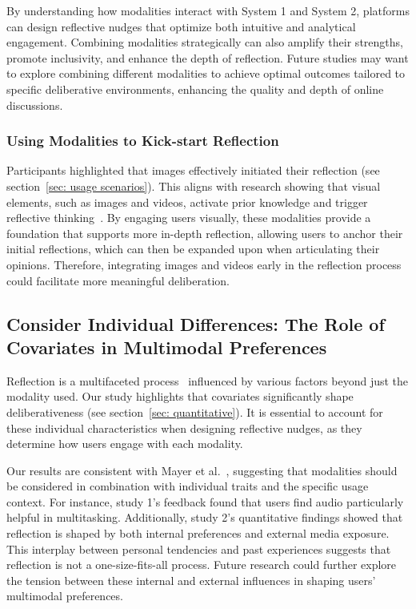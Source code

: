 By understanding how modalities interact with System 1 and System 2, platforms can design reflective nudges that optimize both intuitive and analytical engagement. Combining modalities strategically can also amplify their strengths, promote inclusivity, and enhance the depth of reflection. Future studies may want to explore combining different modalities to achieve optimal outcomes tailored to specific deliberative environments, enhancing the quality and depth of online discussions.

\subsubsection{Using Modalities to Kick-start Reflection}
Participants highlighted that images effectively initiated their reflection (see section~\ref{sec: usage scenarios}). This aligns with research showing that visual elements, such as images and videos, activate prior knowledge and trigger reflective thinking~\cite{mayer2005cambridge}. By engaging users visually, these modalities provide a foundation that supports more in-depth reflection, allowing users to anchor their initial reflections, which can then be expanded upon when articulating their opinions. Therefore, integrating images and videos early in the reflection process could facilitate more meaningful deliberation.

\subsection{Consider Individual Differences: The Role of Covariates in Multimodal Preferences}
Reflection is a multifaceted process~\cite{mayer2005cambridge} influenced by various factors beyond just the modality used. Our study highlights that covariates significantly shape deliberativeness (see section~\ref{sec: quantitative}). It is essential to account for these individual characteristics when designing reflective nudges, as they determine how users engage with each modality.

Our results are consistent with Mayer et al.~\cite{mayer2002multimedia, mayer1990illustration}, suggesting that modalities should be considered in combination with individual traits and the specific usage context. For instance, study 1's feedback found that users find audio particularly helpful in multitasking. Additionally, study 2's quantitative findings showed that reflection is shaped by both internal preferences and external media exposure. This interplay between personal tendencies and past experiences suggests that reflection is not a one-size-fits-all process. Future research could further explore the tension between these internal and external influences in shaping users’ multimodal preferences.

